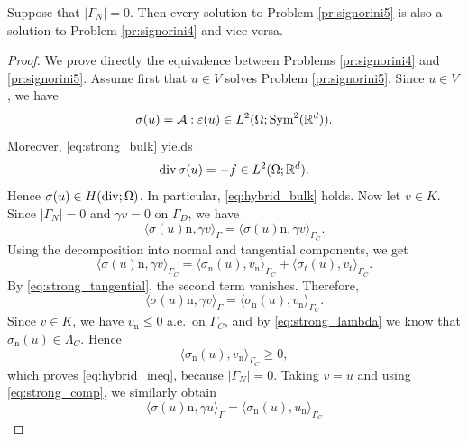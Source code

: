\begin{proposition}
	Suppose that $|\Gamma_N|= 0$. Then every solution to Problem \ref{pr:signorini5} is also a solution to Problem \ref{pr:signorini4} and vice versa.
\end{proposition}
\begin{proof}
	We prove directly the equivalence between Problems \ref{pr:signorini4} and \ref{pr:signorini5}. Assume first that $u\in V$ solves Problem \ref{pr:signorini5}. Since $u\in V$, we have
	\begin{equation*}
		\sigma(u)=\mathcal A:\varepsilon(u)\in L^2(\Omega;\mathrm{Sym}^2({\mathbb R}^d)).
	\end{equation*}
	Moreover, \eqref{eq:strong_bulk} yields
	\begin{equation*}
		\diver\sigma(u)=-f\in L^2(\Omega;\R^d).
	\end{equation*}
	Hence $\sigma(u)\in H(\diver;\Omega)$. In particular, \eqref{eq:hybrid_bulk} holds. Now let $v\in K$. Since $|\Gamma_N|=0$ and $\gamma v=0$ on $\Gamma_D$, we have
	\begin{equation*}
		\langle \sigma(u)\mathrm n,\gamma v\rangle_\Gamma
		=
		\langle \sigma(u)\mathrm n,\gamma v\rangle_{\Gamma_C}.
	\end{equation*}
	Using the decomposition into normal and tangential components, we get
	\begin{equation*}
		\langle \sigma(u)\mathrm n,\gamma v\rangle_{\Gamma_C}
		=
		\langle \sigma_\mathrm n(u),v_\mathrm n\rangle_{\Gamma_C}
		+
		\langle \sigma_t(u),v_t\rangle_{\Gamma_C}.
	\end{equation*}
	By \eqref{eq:strong_tangential}, the second term vanishes. Therefore,
	\begin{equation*}
		\langle \sigma(u)\mathrm n,\gamma v\rangle_\Gamma
		=
		\langle \sigma_\mathrm n(u),v_\mathrm n\rangle_{\Gamma_C}.
	\end{equation*}
	Since $v\in K$, we have $v_\mathrm n\le 0$ a.e.\ on $\Gamma_C$, and by \eqref{eq:strong_lambda} we know that $\sigma_\mathrm n(u)\in\Lambda_C$. Hence
	\begin{equation*}
		\langle \sigma_\mathrm n(u),v_\mathrm n\rangle_{\Gamma_C}\ge 0,
	\end{equation*}
	which proves \eqref{eq:hybrid_ineq}, because $|\Gamma_N|=0$. Taking $v=u$ and using \eqref{eq:strong_comp}, we similarly obtain
	\begin{equation*}
		\langle \sigma(u)\mathrm n,\gamma u\rangle_\Gamma
		=
		\langle \sigma_\mathrm n(u),u_\mathrm n\rangle_{\Gamma_C}

\end{equation*}
\end{proof}
